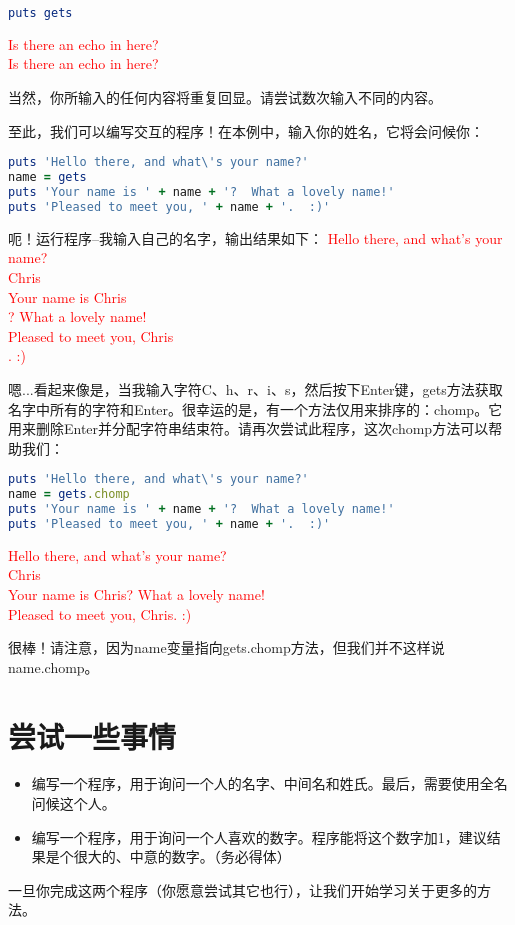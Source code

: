 \begin{lstlisting}[language=ruby]
puts gets
\end{lstlisting}
\textcolor{red}{
Is there an echo in here? \\
Is there an echo in here?
}

当然，你所输入的任何内容将重复回显。请尝试数次输入不同的内容。

至此，我们可以编写交互的程序！在本例中，输入你的姓名，它将会问候你：
\begin{lstlisting}[language=ruby]
puts 'Hello there, and what\'s your name?'
name = gets
puts 'Your name is ' + name + '?  What a lovely name!'
puts 'Pleased to meet you, ' + name + '.  :)'
\end{lstlisting}

呃！运行程序--我输入自己的名字，输出结果如下：
\textcolor{red}{
Hello there, and what's your name? \\
Chris \\
Your name is Chris \\
?  What a lovely name! \\
Pleased to meet you, Chris \\
.  :)
}

嗯...看起来像是，当我输入字符C、h、r、i、s，然后按下Enter键，gets方法获取名字中所有的字符和Enter。很幸运的是，有一个方法仅用来排序的：chomp。它用来删除Enter并分配字符串结束符。请再次尝试此程序，这次chomp方法可以帮助我们：
\begin{lstlisting}[language=ruby]
puts 'Hello there, and what\'s your name?'
name = gets.chomp
puts 'Your name is ' + name + '?  What a lovely name!'
puts 'Pleased to meet you, ' + name + '.  :)'
\end{lstlisting}
\textcolor{red}{
Hello there, and what's your name? \\
Chris \\
Your name is Chris?  What a lovely name! \\
Pleased to meet you, Chris.  :)
}

很棒！请注意，因为name变量指向gets.chomp方法，但我们并不这样说name.chomp。

\section{尝试一些事情}

\begin{itemize}
\item 编写一个程序，用于询问一个人的名字、中间名和姓氏。最后，需要使用全名问候这个人。
\item 编写一个程序，用于询问一个人喜欢的数字。程序能将这个数字加1，建议结果是个很大的、中意的数字。（务必得体）
\end{itemize}

一旦你完成这两个程序（你愿意尝试其它也行），让我们开始学习关于更多的方法。

